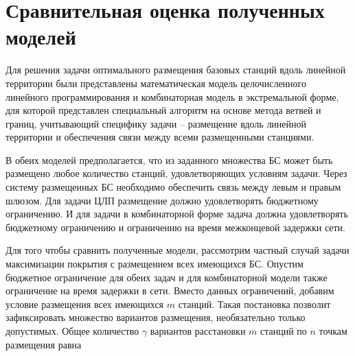





\section{Сравнительная оценка полученных моделей}
Для решения задачи оптимального размещения базовых станций вдоль линейной территории были представлены математическая модель целочисленного линейного программирования и комбинаторная модель в экстремальной форме, для которой представлен специальный алгоритм на основе метода ветвей и границ, учитывающий специфику задачи -- размещение вдоль линейной территории и обеспечения связи между всеми размещенными станциями.

В обеих моделей предполагается, что из заданного множества БС может быть размещено любое количество станций, удовлетворяющих условиям задачи. Через систему размещенных БС необходимо обеспечить связь между левым и правым шлюзом. Для задачи ЦЛП размещение должно удовлетворять бюджетному ограничению. И для задачи в комбинаторной форме задача должна удовлетворять бюджетному ограничению и ограничению на время межконцевой задержки сети.

Для того чтобы сравнить полученные модели, рассмотрим частный случай задачи максимизации покрытия с размещением всех имеющихся БС. Опустим бюджетное ограничение для обеих задач и для комбинаторной модели также ограничение на время задержки в сети. Вместо данных ограничений, добавим условие размещения всех имеющихся $m$ станций. Такая постановка позволит зафиксировать множество вариантов размещения, необязательно только допустимых. Общее количество $\gamma$ вариантов расстановки $m$ станций по $n$ точкам размещения равна 


